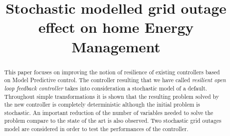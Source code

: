 \documentclass[conference]{IEEEtran}
\begin{document}
\title{Stochastic modelled grid outage effect on home Energy Management}


\author{
\and
{}
\and
{}
\and
{}
}


\maketitle

\begin{abstract}
This paper focuses on improving the notion of resilience of existing controllers based on Model Predictive control. The controller resulting that we have called \textit{resilient open loop feedback controller} takes into consideration a stochastic model of a default. Throughout simple transformations it is shown that the resulting problem solved by the new controller is completely deterministic although the initial problem is stochastic. An important reduction of the number of variables needed to solve the problem compare to the state of the art is also observed. Two stochastic grid outages model are considered in order to test the performances of the controller.
\end{abstract}
\end{document}
